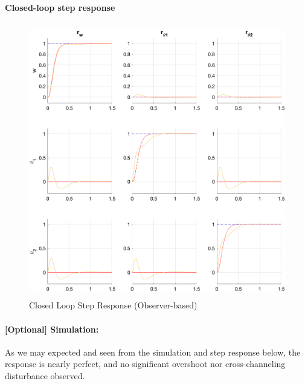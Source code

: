 \documentclass{tron}
\begin{document}
\paragraph{Closed-loop step response}
\begin{figure}[H]
	\centering
	\includegraphics[height=450px]{../matlab/output/p6b/mimo_response_Cls_obs IC=0}
	\caption{Closed Loop Step Response (Observer-based)}
	\label{fig:p6b:step-response:obs}
\end{figure}

\clearpage
\paragraph{[Optional] Simulation:}
As we may expected and seen from the simulation and step response below, the response is nearly perfect, and no significant overshoot nor cross-channeling disturbance observed.
\end{document}
